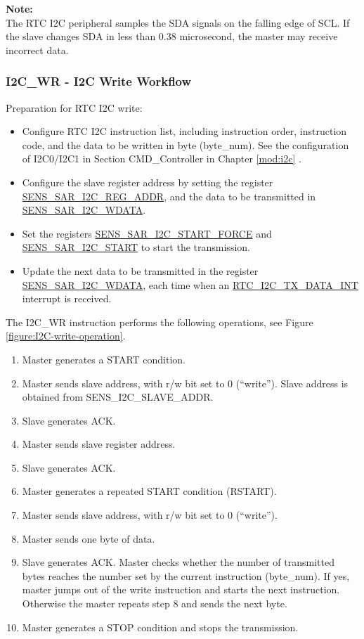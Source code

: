 \documentclass[main\_\_EN.tex]{subfiles}
\begin{document}
\textbf{Note:} \\
The RTC I2C peripheral samples the SDA signals on the falling edge of SCL. If the slave changes SDA in less than 0.38 microsecond, the master may receive incorrect data.


\subsubsection{I2C\_WR - I2C Write Workflow}

Preparation for RTC I2C write:

\begin{itemize}
    \item Configure RTC I2C instruction list, including instruction order, instruction code, and the data to be written in byte (byte\_num). See the configuration of I2C0/I2C1 in Section CMD\_Controller in Chapter \ref{mod:i2c} \textit{}.
    \item Configure the slave register address by setting the register \hyperref[fielddesc:SENSSARI2CREGADDR]{SENS\_SAR\_I2C\_REG\_ADDR}, and the data to be transmitted in \hyperref[fielddesc:SENSSARI2CWDATA]{SENS\_SAR\_I2C\_WDATA}.
    \item Set the registers \hyperref[fielddesc:SENSSARI2CSTARTFORCE]{SENS\_SAR\_I2C\_START\_FORCE} and \hyperref[fielddesc:SENSSARI2CSTART]{SENS\_SAR\_I2C\_START} to start the transmission.
    \item Update the next data to be transmitted in the register \hyperref[fielddesc:SENSSARI2CWDATA]{SENS\_SAR\_I2C\_WDATA}, each time when an \hyperref[interrupt:RTCI2CTXDATAINT]{RTC\_I2C\_TX\_DATA\_INT} interrupt is received.
\end{itemize}

The I2C\_WR instruction performs the following operations, see Figure \ref{figure:I2C-write-operation}.

\begin{enumerate}
    \item Master generates a START condition.
    \item Master sends slave address, with r/w bit set to 0 (“write”). Slave address is obtained from  SENS\_I2C\_SLAVE\_ADDR.
    \item Slave generates ACK.
    \item Master sends slave register address.
    \item Slave generates ACK.
    \item Master generates a repeated START condition (RSTART).
    \item Master sends slave address, with r/w bit set to 0 (“write”).
    \item Master sends one byte of data.
    \item Slave generates ACK. Master checks whether the number of transmitted bytes reaches the number set by the current instruction (byte\_num). If yes, master jumps out of the write instruction and starts the next instruction. Otherwise the master repeats step 8 and sends the next byte.
    \item Master generates a STOP condition and stops the transmission.
\end{enumerate}
\end{document}
